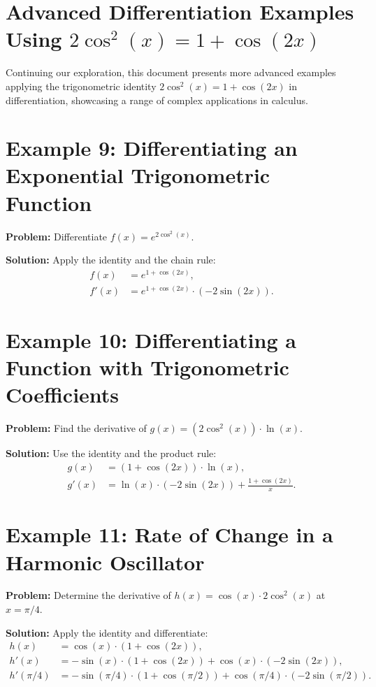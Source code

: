 \documentclass[a4paper,12pt]{book}
\newcounter{example}
\begin{document}
\section*{Advanced Differentiation Examples Using \(2 \cos^2(x) = 1 + \cos(2x)\)}
Continuing our exploration, this document presents more advanced examples applying the trigonometric identity \(2 \cos^2(x) = 1 + \cos(2x)\) in differentiation, showcasing a range of complex applications in calculus.

\section*{Example 9: Differentiating an Exponential Trigonometric Function}
\textbf{Problem:} Differentiate \(f(x) = e^{2 \cos^2(x)}\).

\textbf{Solution:}
Apply the identity and the chain rule:
\begin{align*}
f(x) &= e^{1 + \cos(2x)}, \\
f'(x) &= e^{1 + \cos(2x)} \cdot (-2 \sin(2x)).
\end{align*}

\section*{Example 10: Differentiating a Function with Trigonometric Coefficients}
\textbf{Problem:} Find the derivative of \(g(x) = (2 \cos^2(x)) \cdot \ln(x)\).

\textbf{Solution:}
Use the identity and the product rule:
\begin{align*}
g(x) &= (1 + \cos(2x)) \cdot \ln(x), \\
g'(x) &= \ln(x) \cdot (-2 \sin(2x)) + \frac{1 + \cos(2x)}{x}.
\end{align*}

\section*{Example 11: Rate of Change in a Harmonic Oscillator}
\textbf{Problem:} Determine the derivative of \(h(x) = \cos(x) \cdot 2 \cos^2(x)\) at \(x = \pi/4\).

\textbf{Solution:}
Apply the identity and differentiate:
\begin{align*}
h(x) &= \cos(x) \cdot (1 + \cos(2x)), \\
h'(x) &= -\sin(x) \cdot (1 + \cos(2x)) + \cos(x) \cdot (-2 \sin(2x)), \\
h'(\pi/4) &= -\sin(\pi/4) \cdot (1 + \cos(\pi/2)) + \cos(\pi/4) \cdot (-2 \sin(\pi/2)).
\end{align*}
\end{document}
